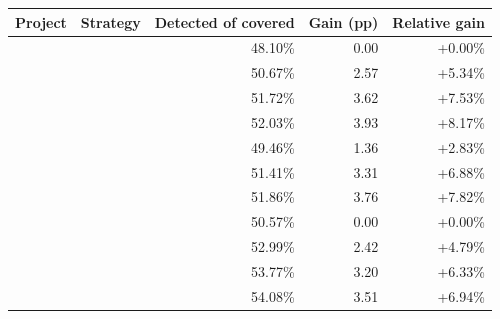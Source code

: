   \renewcommand{\theHreporttablerow}{tab-mutation-score-improvements.\arabic{reporttablerow}}
  \setcounter{reporttablerow}{0}
  \begin{tabular}{llrrr}
  \toprule
  Project & Strategy & Detected of covered & Gain (pp) & Relative gain \\
  \midrule
  {reporttablerow}\label{tabrow:tab-mutation-score-improvements:eqbench-es-default-1s@3AINITIAL}\DatasetEqBenchA{} & \VariantInitial{} & 48.10\% & 0.00 & +0.00\% \\
  {reporttablerow}\label{tabrow:tab-mutation-score-improvements:eqbench-es-default-1s@3ANAIVE_10_TRIES}\DatasetEqBenchA{} & \VariantNaiveA{} & 50.67\% & 2.57 & +5.34\% \\
  {reporttablerow}\label{tabrow:tab-mutation-score-improvements:eqbench-es-default-1s@3ANAIVE_50_TRIES}\DatasetEqBenchA{} & \VariantNaiveB{} & 51.72\% & 3.62 & +7.53\% \\
  {reporttablerow}\label{tabrow:tab-mutation-score-improvements:eqbench-es-default-1s@3ANAIVE_200_TRIES}\DatasetEqBenchA{} & \VariantNaiveC{} & 52.03\% & 3.93 & +8.17\% \\
  {reporttablerow}\label{tabrow:tab-mutation-score-improvements:eqbench-es-default-1s@3AIMPROVED_10_TRIES}\DatasetEqBenchA{} & \VariantImprovedA{} & 49.46\% & 1.36 & +2.83\% \\
  {reporttablerow}\label{tabrow:tab-mutation-score-improvements:eqbench-es-default-1s@3AIMPROVED_50_TRIES}\DatasetEqBenchA{} & \VariantImprovedB{} & 51.41\% & 3.31 & +6.88\% \\
  {reporttablerow}\label{tabrow:tab-mutation-score-improvements:eqbench-es-default-1s@3AIMPROVED_200_TRIES}\DatasetEqBenchA{} & \VariantImprovedC{} & 51.86\% & 3.76 & +7.82\% \\
  {reporttablerow}\label{tabrow:tab-mutation-score-improvements:eqbench-es-default-10s@3AINITIAL}\DatasetEqBenchB{} & \VariantInitial{} & 50.57\% & 0.00 & +0.00\% \\
  {reporttablerow}\label{tabrow:tab-mutation-score-improvements:eqbench-es-default-10s@3ANAIVE_10_TRIES}\DatasetEqBenchB{} & \VariantNaiveA{} & 52.99\% & 2.42 & +4.79\% \\
  {reporttablerow}\label{tabrow:tab-mutation-score-improvements:eqbench-es-default-10s@3ANAIVE_50_TRIES}\DatasetEqBenchB{} & \VariantNaiveB{} & 53.77\% & 3.20 & +6.33\% \\
  {reporttablerow}\label{tabrow:tab-mutation-score-improvements:eqbench-es-default-10s@3ANAIVE_200_TRIES}\DatasetEqBenchB{} & \VariantNaiveC{} & 54.08\% & 3.51 & +6.94\% \\

\end{tabular}
